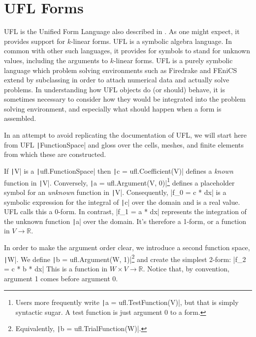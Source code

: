 \documentclass[a4paper,11pt]{article}
\begin{document}
\section{UFL Forms}

UFL is the Unified Form Language \parencite{alnaes2014} also described in \cite{homolya2018}. As one might expect, it provides support for $k$-linear forms. UFL is a symbolic algebra language. In common with other such languages, it provides for symbols to stand for unknown values, including the arguments to $k$-linear forms. UFL is a purely symbolic language which problem solving environments such as Firedrake and FEniCS extend by subclassing in order to attach numerical data and actually solve problems. In understanding how UFL objects do (or should) behave, it is sometimes necessary to consider how they would be integrated into the problem solving environment, and especially what should happen when a form is assembled.

In an attempt to avoid replicating the documentation of UFL, we will start here from UFL \texttt|FunctionSpace| and gloss over the cells, meshes, and finite elements from which these are constructed.

If \texttt|V| is a \texttt|ufl.FunctionSpace| then \texttt|c = ufl.Coefficient(V)| defines a \emph{known} function in \texttt|V|. Conversely, \texttt|a = ufl.Argument(V, 0)|\footnote{Users more frequently write \texttt|a = ufl.TestFunction(V)|, but that is simply syntactic sugar. A test function is just argument 0 to a form.} defines a placeholder symbol for an \emph{unknown} function in \texttt|V|.
Consequently, 
|f_0 = c * dx| 
is a symbolic expression for the integral of \texttt|c| over the domain and is a real value. UFL calls this a 0-form. In contrast, 
|f_1 = a * dx|
represents the integration of the unknown function \texttt|a| over the domain. It's therefore a 1-form, or a function in $V\rightarrow\mathbb{R}$.

In order to make the argument order clear, we introduce a second function space, \texttt|W|. We  define \texttt|b = ufl.Argument(W, 1)|\footnote{Equivalently, \texttt|b = ufl.TrialFunction(W)|.} and create the simplest 2-form:
|f_2 = c * b * dx|
This is a function in $W\times V\rightarrow\mathbb{R}$. Notice that, by convention, argument 1 comes before argument 0.
\end{document}

